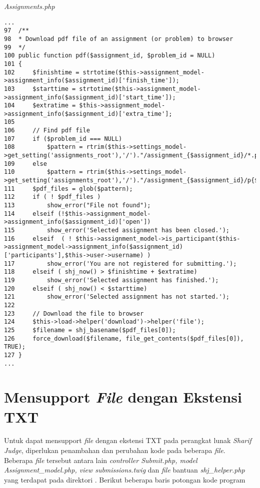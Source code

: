 \textit{Assignments.php}
\begin{lstlisting}[basicstyle=\ttfamily, frame=single,
columns=fullflexible, keepspaces=true, breaklines=true]
...
97	/**
98	* Download pdf file of an assignment (or problem) to browser
99	*/
100	public function pdf($assignment_id, $problem_id = NULL)
101	{
102		$finishtime = strtotime($this->assignment_model->assignment_info($assignment_id)['finish_time']);
103		$starttime = strtotime($this->assignment_model->assignment_info($assignment_id)['start_time']);
104		$extratime = $this->assignment_model->assignment_info($assignment_id)['extra_time'];
105
106		// Find pdf file
107		if ($problem_id === NULL)
108			$pattern = rtrim($this->settings_model->get_setting('assignments_root'),'/')."/assignment_{$assignment_id}/*.pdf";
109		else
110			$pattern = rtrim($this->settings_model->get_setting('assignments_root'),'/')."/assignment_{$assignment_id}/p{$problem_id}/*.pdf";
111		$pdf_files = glob($pattern);
112		if ( ! $pdf_files )
113			show_error("File not found");
114		elseif (!$this->assignment_model->assignment_info($assignment_id)['open'])
115			show_error('Selected assignment has been closed.');
116		elseif	( ! $this->assignment_model->is_participant($this->assignment_model->assignment_info($assignment_id)['participants'],$this->user->username) )
117			show_error('You are not registered for submitting.');
118		elseif ( shj_now() > $finishtime + $extratime)
119			show_error('Selected assignment has finished.');
120		elseif ( shj_now() < $starttime)
121			show_error('Selected assignment has not started.');
122			
123		// Download the file to browser
124		$this->load->helper('download')->helper('file');
125		$filename = shj_basename($pdf_files[0]);
126		force_download($filename, file_get_contents($pdf_files[0]), TRUE);
127	}
...
\end{lstlisting}

\section{Mensupport \textit{File} dengan Ekstensi TXT}
Untuk dapat mensupport \textit{file} dengan ekstensi TXT pada perangkat lunak \textit{Sharif Judge}, diperlukan penambahan dan perubahan kode pada beberapa \textit{file}. Beberapa \textit{file} tersebut antara lain \textit{controller Submit.php, model Assignment\_model.php, view submissions.twig} dan \textit{file} bantuan \textit{shj\_helper.php} yang terdapat pada direktori . Berikut beberapa baris potongan kode program

